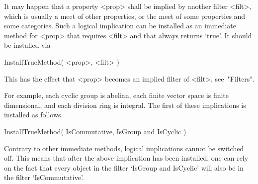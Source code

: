 
It may happen that a property <prop> shall be implied by another filter
<filt>, which is usually a meet of other properties,
or the meet of some properties and some categories.
Such a logical implication can be installed as an immediate method for
<prop> that requires <filt> and that always returns `true'.
It should be installed via

\>InstallTrueMethod( <prop>, <filt> )

This has the effect that <prop> becomes an implied filter of <filt>,
see~"Filters".

For example, each cyclic group is abelian,
each finite vector space is finite dimensional,
and each division ring is integral.
The first of these implications is installed as follows.

\begintt
    InstallTrueMethod( IsCommutative, IsGroup and IsCyclic )
\endtt

Contrary to other immediate methods,
logical implications cannot be switched off.
This means that after the above implication has been installed,
one can rely on the fact that every object in the filter
`IsGroup and IsCyclic' will also be in the filter `IsCommutative'.


